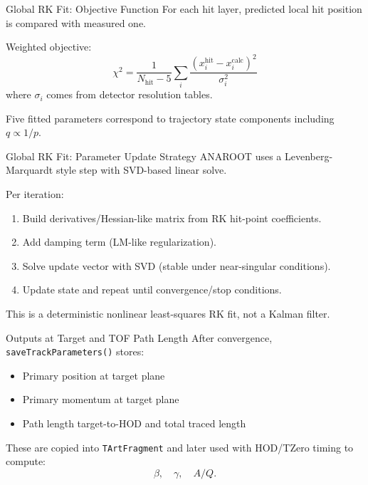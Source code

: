 \documentclass[aspectratio=169]{beamer}
\begin{document}
\begin{frame}{Global RK Fit: Objective Function}
For each hit layer, predicted local hit position is compared with measured one.

\vspace{0.2cm}
Weighted objective:
\[
\chi^2 = \frac{1}{N_{\mathrm{hit}}-5}\sum_i
\frac{\left(x_i^{\mathrm{hit}}-x_i^{\mathrm{calc}}\right)^2}{\sigma_i^2}
\]
where \(\sigma_i\) comes from detector resolution tables.

\vspace{0.2cm}
Five fitted parameters correspond to trajectory state components including \(q\propto 1/p\).
\end{frame}

\begin{frame}{Global RK Fit: Parameter Update Strategy}
ANAROOT uses a Levenberg-Marquardt style step with SVD-based linear solve.

\vspace{0.2cm}
Per iteration:
\begin{enumerate}
\item Build derivatives/Hessian-like matrix from RK hit-point coefficients.
\item Add damping term (LM-like regularization).
\item Solve update vector with SVD (stable under near-singular conditions).
\item Update state and repeat until convergence/stop conditions.
\end{enumerate}

\vspace{0.2cm}
This is a deterministic nonlinear least-squares RK fit, not a Kalman filter.
\end{frame}

\begin{frame}{Outputs at Target and TOF Path Length}
After convergence, \texttt{saveTrackParameters()} stores:
\begin{itemize}
\item Primary position at target plane
\item Primary momentum at target plane
\item Path length target-to-HOD and total traced length
\end{itemize}

These are copied into \texttt{TArtFragment} and later used with HOD/TZero timing to compute:
\[
\beta,\quad \gamma,\quad A/Q.
\]
\end{frame}
\end{document}
